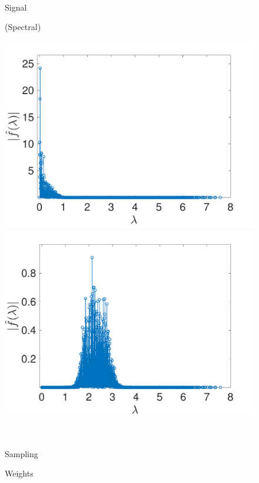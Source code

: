 \documentclass[journal, 10pt]{IEEEtran}
\begin{document}
{\begin{figure}[H]
\begin{minipage}[m]{0.4\linewidth}
\end{minipage} \\
\begin{minipage}[m]{0.16\linewidth}
\centerline{\small{Signal}}
\centerline{\small{(Spectral)}}
\end{minipage}
\begin{minipage}[m]{0.4\linewidth}
\centerline{\includegraphics[width=.85\linewidth]{fig_rec_low_signal_spectral}}
\end{minipage}
\begin{minipage}[m]{0.4\linewidth}
\centerline{\includegraphics[width=.85\linewidth]{fig_rec_band_signal_spectral}}
\end{minipage} \\ 
\begin{minipage}[m]{0.16\linewidth}
\centerline{\small{Sampling}}
\centerline{\small{Weights}}
\end{minipage}
\begin{minipage}[m]{0.4\linewidth}

\end{minipage}
\end{figure}}
\end{document}
